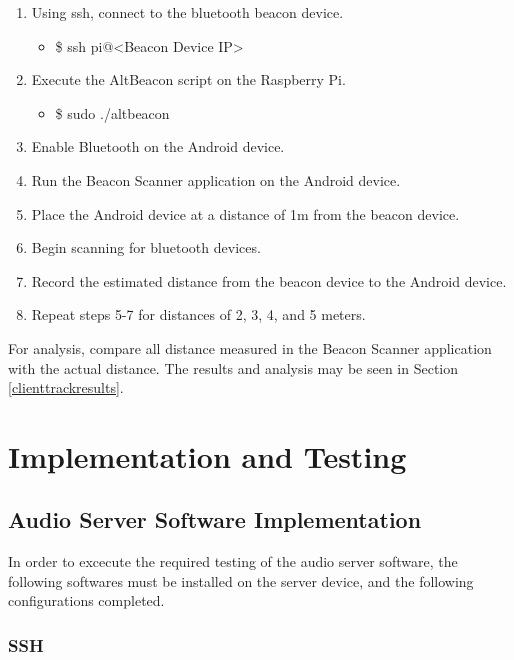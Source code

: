 \documentclass[11pt,a4paper,headinclude=false,footinclude=false]{scrreprt}
\begin{document}
\begin{enumerate}
 \item Using ssh, connect to the bluetooth beacon device.
 \begin{itemize}
  \item \$ ssh pi@<Beacon Device IP>
 \end{itemize}
 \item Execute the AltBeacon script on the Raspberry Pi.
 \begin{itemize}
  \item \$ sudo ./altbeacon
 \end{itemize}
 \item Enable Bluetooth on the Android device.
 \item Run the Beacon Scanner application on the Android device.
 \item Place the Android device at a distance of 1m from the beacon device.
 \item Begin scanning for bluetooth devices.
 \item Record the estimated distance from the beacon device to the Android
 device.
 \item Repeat steps 5-7 for distances of 2, 3, 4, and 5 meters.
\end{enumerate}

For analysis, compare all distance measured in the Beacon Scanner
application with the actual distance. The results and analysis may be
seen in Section \ref{clienttrackresults}.

\chapter{Implementation and Testing}\label{implementation-and-testing}

\section{\texorpdfstring{Audio Server Software Implementation
\label{audioserverimplementation}}{Audio Server Software Implementation }}\label{audio-server-software-implementation}

In order to excecute the required testing of the audio server software,
the following softwares must be installed on the server device, and the
following configurations completed.

\subsection{SSH}\label{ssh}
\end{document}
